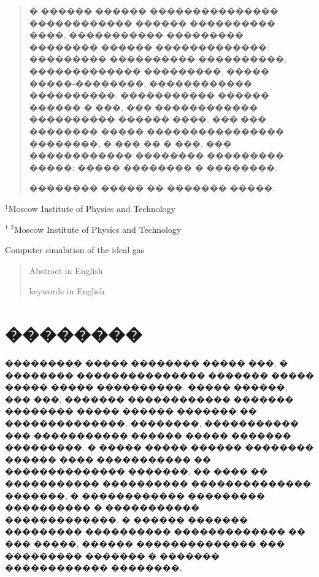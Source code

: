 
\begin{abstract}
    \noindent � ������ ������ ��������������� ������������ ������ ���������� ����, ����������� ��������� �������� ������ �������������: ��������� ����������-����������, ������������� ���������, ����� �����-��������, ������������ ����������.
    ����������� ������ ������ � ���, ��� ������������ ���������� ������ ����, ��� ��� �������� ����� ���������������� ��������, � ��� �� � ���, ��� ������������ �������� ��������� �����: ����� �������� � ��������.

    \kwr �������� ����� �� ������� �����.


\end{abstract}

{$^{1}$Moscow Institute of Physics and Technology \par
$^{1,2}$Moscow Institute of Physics and Technology\par}
{Computer simulation of the ideal gas}

\begin{abstract}
    Abstract in English

    \kwe keywords in English.
\end{abstract}
\bigskip


\section{��������}

\indent ��������� ����� �������� ����� ���, � �������� ��������������� ������� ����� ����� ����� ����������. ����� ������, ��� ���,
������� ������������ ������� �������� ����� ������ ������� �� ��������������. ��������, ����������� ��� ����������� ������ ����� ������� ���������.
� ����� ����� ������ �������� ������ ���� ����������� �� �������������� �������, �� ���� �� ����������� ���������� �������������� �������,
� ������������ ��������� ���������� � ����������� �������������. � ������ ������� ��������� ���������� ������������� �� ��� �����, ������ �������������� ��� ���������
������� � ������� ������������ ��������.

